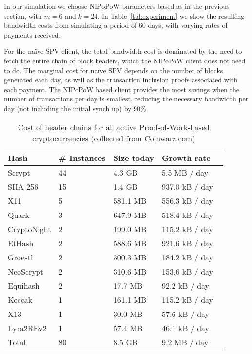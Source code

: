 In our simulation we choose NIPoPoW parameters based as in the previous section, with $m=6$ and $k=24$.
In Table~\ref{tbl:experiment} we show the resulting bandwidth costs from simulating a period of 60 days, with varying rates of payments received.

 For the na\"ive SPV client, the total bandwidth cost is dominated by the need to fetch the entire chain of block headers, which the NIPoPoW client does not need to do. The marginal cost for na\"ive SPV depends on the number of blocks generated each day, as well as the transaction inclusion proofs associated with each payment. The NIPoPoW based client provides the most savings when the number of transactions per day is smallest, reducing the necessary bandwidth per day (not including the initial synch up) by 90\%.

\begin{table}
  \caption{Cost of header chains for all active Proof-of-Work-based cryptocurrencies (collected from \url{Coinwarz.com})}
  \label{tbl:currencies}
\small
  \begin{tabular}{l|l|l|l}
    {\bf Hash} & {\bf \# Instances} & {\bf Size today} & {\bf Growth rate}  \\
    \hline
    Scrypt  & 44  & 4.3 GB  & 5.5 MB / day \  \\
    SHA-256  & 15  & 1.4 GB  & 937.0 kB / day \  \\
    X11  & 5  & 581.1 MB  & 556.3 kB / day \  \\
    Quark  & 3  & 647.9 MB  & 518.4 kB / day \  \\
    CryptoNight  & 2  & 199.0 MB  & 115.2 kB / day \  \\
    EtHash  & 2  & 588.6 MB  & 921.6 kB / day \  \\
    Groestl  & 2  & 300.3 MB  & 184.2 kB / day \  \\
    NeoScrypt  & 2  & 310.6 MB  & 153.6 kB / day \  \\
    Equihash  & 2  & 17.7 MB  & 92.2 kB / day \  \\
    Keccak  & 1  & 161.1 MB  & 115.2 kB / day \  \\
    X13  & 1  & 30.0 MB  & 57.6 kB / day \  \\
    Lyra2REv2  & 1  & 57.4 MB  & 46.1 kB / day \  \\
    \hline
    Total  & 80   &  8.5 GB  & 9.2 MB  / day  \\
  \end{tabular}
\end{table}



